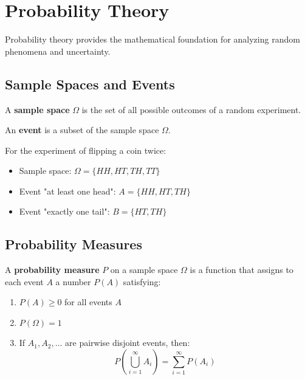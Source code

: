 \chapter{Probability Theory}

Probability theory provides the mathematical foundation for analyzing random phenomena and uncertainty.

\section{Sample Spaces and Events}

\begin{definition}
A \textbf{sample space} $\Omega$ is the set of all possible outcomes of a random experiment.
\end{definition}

\begin{definition}[Event]
An \textbf{event} is a subset of the sample space $\Omega$.
\end{definition}

\begin{example}
For the experiment of flipping a coin twice:
\begin{itemize}
    \item Sample space: $\Omega = \{HH, HT, TH, TT\}$
    \item Event "at least one head": $A = \{HH, HT, TH\}$
    \item Event "exactly one tail": $B = \{HT, TH\}$
\end{itemize}
\end{example}

\section{Probability Measures}

\begin{definition}
A \textbf{probability measure} $P$ on a sample space $\Omega$ is a function that assigns to each event $A$ a number $P(A)$ satisfying:
\begin{enumerate}
    \item $P(A) \geq 0$ for all events $A$
    \item $P(\Omega) = 1$
    \item If $A_1, A_2, \ldots$ are pairwise disjoint events, then:
    \[P\left(\bigcup_{i=1}^{\infty} A_i\right) = \sum_{i=1}^{\infty} P(A_i)\]
\end{enumerate}
\end{definition}

